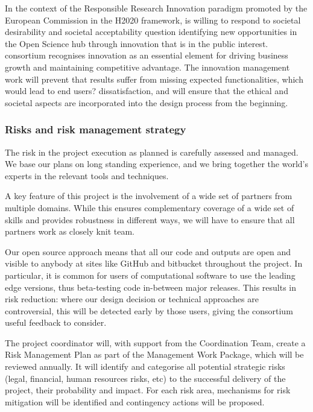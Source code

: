 In the context of the Responsible Research Innovation paradigm promoted by the European Commission in
the H2020 framework, \TheProject is willing to respond to societal desirability and societal acceptability
question identifying new opportunities in the Open Science hub through innovation that is in the public
interest. \TheProject consortium recognises innovation as an essential element for driving business growth
and maintaining competitive advantage. The innovation management work will prevent that \TheProject
results suffer from missing expected functionalities, which would lead to end users? dissatisfaction, and will
ensure that the ethical and societal aspects are incorporated into the design process from the beginning.

\subsubsection{Risks and risk management strategy}\label{sec:risks}

The risk in the project execution as planned is carefully assessed and
managed. We base our plans on long standing experience, and we bring
together the world's experts in the relevant tools and techniques.

A key feature of this project is the involvement of a wide set of
partners from multiple domains. While this ensures complementary
coverage of a wide set of skills and provides robustness in different
ways, we will have to ensure that all partners work as closely knit
team.

Our open source approach means that all our code and outputs
are open and visible to anybody at sites like GitHub and bitbucket
throughout the project. In particular, it is common for users of
computational software to use the leading edge versions, thus
beta-testing code in-between major releases. This results in risk
reduction: where our design decision or technical approaches are
controversial, this will be detected early by those users, giving the
consortium useful feedback to consider.

The project coordinator will, with support from the Coordination Team, create
a Risk Management Plan  as part of the Management
Work Package, which will be reviewed annually. It will identify and categorise all
potential strategic risks (legal, financial, human resources risks, etc)
to the successful delivery of the project, their probability and impact.
For each risk area, mechanisms for risk mitigation will be identified
and contingency actions will be proposed.

